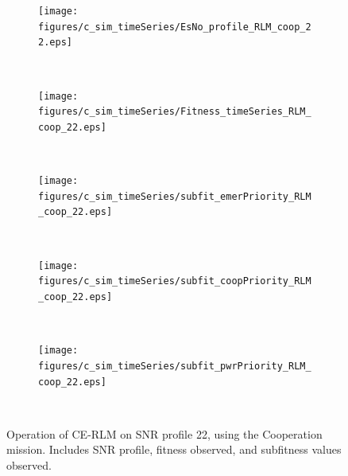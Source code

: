 \begin{figure}[ht!]
\centering
\begin{subfigure}{\linewidth}
	\centering
	\texttt{[image: figures/c\_sim\_timeSeries/EsNo\_profile\_RLM\_coop\_22.eps]}
\end{subfigure}\\
\begin{subfigure}{\linewidth}
	\centering
	\texttt{[image: figures/c\_sim\_timeSeries/Fitness\_timeSeries\_RLM\_coop\_22.eps]}
\end{subfigure}\\
\begin{subfigure}{\linewidth}
	\centering
	\texttt{[image: figures/c\_sim\_timeSeries/subfit\_emerPriority\_RLM\_coop\_22.eps]}
\end{subfigure}\\
\begin{subfigure}{\linewidth}
	\centering
	\texttt{[image: figures/c\_sim\_timeSeries/subfit\_coopPriority\_RLM\_coop\_22.eps]}
	
\end{subfigure}\\
\begin{subfigure}{\linewidth}
	\centering
	\texttt{[image: figures/c\_sim\_timeSeries/subfit\_pwrPriority\_RLM\_coop\_22.eps]}
\end{subfigure}\\
\caption{Operation of CE-RLM on SNR profile 22, using the Cooperation mission. Includes SNR profile, fitness observed, and subfitness values observed.}\label{fig:c22RLMCoop}
\end{figure}

